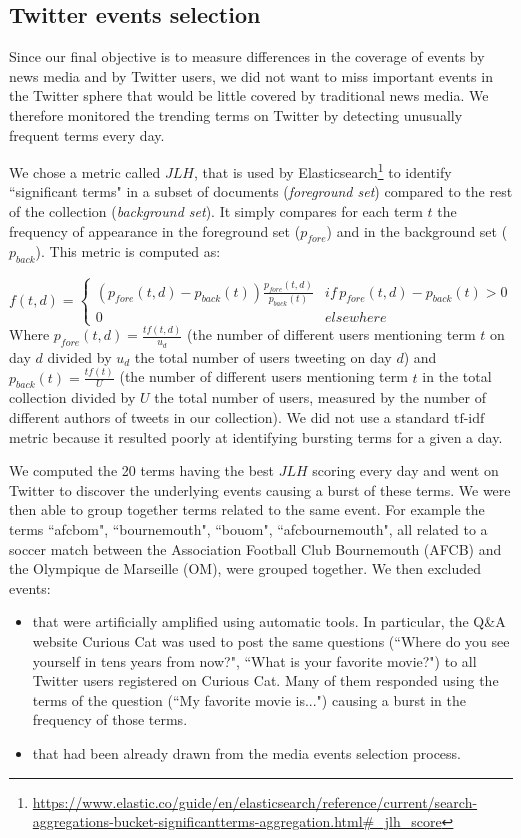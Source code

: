 \subsection{Twitter events selection}
Since our final objective is to measure differences in the coverage of events by news media and by Twitter users, we did not want to miss important events in the Twitter sphere that would be little covered by traditional news media. We therefore monitored the trending terms on Twitter by detecting unusually frequent terms every day. 


We chose a metric called $JLH$, that is used by Elasticsearch\footnote{\url{https://www.elastic.co/guide/en/elasticsearch/reference/current/search-aggregations-bucket-significantterms-aggregation.html\#_jlh_score}}  to identify ``significant terms" in a subset of documents (\textit{foreground set}) compared to the rest of the collection (\textit{background set}). It simply compares for each term $t$ the frequency of appearance in the foreground set ($p_{fore}$) and in the background set ($p_{back}$). This metric is computed as:

$$
f(t,d) = \left\{
	\begin{array}{ll}
		(p_{fore}(t,d) - p_{back}(t))\frac{p_{fore}(t,d)}{p_{back}(t)} & if\, p_{fore}(t,d) - p_{back}(t) > 0\\
		0 & elsewhere
	\end{array}
\right.
$$
Where $p_{fore}(t,d) = \frac{tf(t,d)}{u_d}$  (the number of different users mentioning term $t$ on day $d$ divided by $u_d$ the total number of users tweeting on day $d$) and $p_{back}(t)  = \frac{tf(t)}{U}$ (the number of different users mentioning term $t$ in the total collection divided by $U$  the total number of users, measured by the number of different authors of tweets in our collection). We did not use a standard $\mbox{tf-idf}$ metric because it resulted poorly at identifying bursting terms for a given a day.


We computed the 20 terms having the best $JLH$ scoring every day and went on Twitter to discover the underlying events causing a burst of these terms. We were then able to group together terms related to the same event. For example the terms ``afcbom", ``bournemouth", ``bouom", ``afcbournemouth", all related to a soccer match between the Association Football Club Bournemouth (AFCB) and the Olympique de Marseille (OM), were grouped together. We then excluded events:
\begin{itemize}
\item that were artificially amplified using automatic tools. In particular, the Q\&A website Curious Cat was used to post the same questions (``Where do you see yourself in tens years from now?", ``What is your favorite movie?") to all Twitter users registered on Curious Cat. Many of them responded using the terms of the question (``My favorite movie is...") causing a burst in the frequency of those terms.
\item that had been already drawn from the media events selection process.
\end{itemize}

